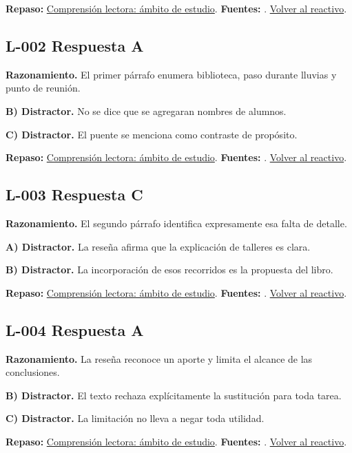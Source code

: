 \textbf{Repaso:} \hyperref[sec:l1]{Comprensión lectora: ámbito de estudio}. \textbf{Fuentes:} \cite{ceneval,reading}. \hyperref[q:L-001]{Volver al reactivo}.\par\medskip

\subsection*{L-002 \quad Respuesta A}\label{s:L-002}
\textbf{Razonamiento.} El primer párrafo enumera biblioteca, paso durante lluvias y punto de reunión.

\textbf{B) Distractor. }No se dice que se agregaran nombres de alumnos.

\textbf{C) Distractor. }El puente se menciona como contraste de propósito.

\textbf{Repaso:} \hyperref[sec:l1]{Comprensión lectora: ámbito de estudio}. \textbf{Fuentes:} \cite{ceneval,reading}. \hyperref[q:L-002]{Volver al reactivo}.\par\medskip

\subsection*{L-003 \quad Respuesta C}\label{s:L-003}
\textbf{Razonamiento.} El segundo párrafo identifica expresamente esa falta de detalle.

\textbf{A) Distractor. }La reseña afirma que la explicación de talleres es clara.

\textbf{B) Distractor. }La incorporación de esos recorridos es la propuesta del libro.

\textbf{Repaso:} \hyperref[sec:l1]{Comprensión lectora: ámbito de estudio}. \textbf{Fuentes:} \cite{ceneval,reading}. \hyperref[q:L-003]{Volver al reactivo}.\par\medskip

\subsection*{L-004 \quad Respuesta A}\label{s:L-004}
\textbf{Razonamiento.} La reseña reconoce un aporte y limita el alcance de las conclusiones.

\textbf{B) Distractor. }El texto rechaza explícitamente la sustitución para toda tarea.

\textbf{C) Distractor. }La limitación no lleva a negar toda utilidad.

\textbf{Repaso:} \hyperref[sec:l1]{Comprensión lectora: ámbito de estudio}. \textbf{Fuentes:} \cite{ceneval,reading}. \hyperref[q:L-004]{Volver al reactivo}.\par\medskip

